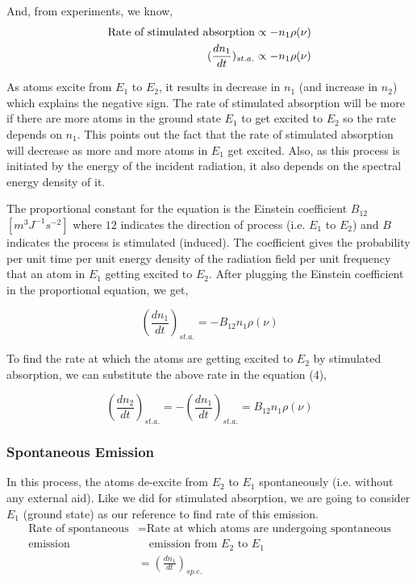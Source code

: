 \documentclass[12pt]{article}
\begin{document}
And, from experiments, we know, 
\begin{align*}
    \textnormal{Rate of stimulated absorption} \propto -n_{1}\rho(\nu) \\ 
    (\frac{dn_{1}}{dt})_{st.a.} \propto -n_{1}\rho(\nu)
\end{align*}

As atoms excite from $E_{1}$ to $E_{2}$, it results in decrease in $n_{1}$ (and increase in $n_{2}$) which explains the negative sign. The rate of stimulated absorption will be more if there are more atoms in the ground state $E_{1}$ to get excited to $E_{2}$ so the rate depends on $n_{1}$. This points out the fact that the rate of stimulated absorption will decrease as more and more atoms in $E_{1}$ get excited. Also, as this process is initiated by the energy of the incident radiation, it also depends on the spectral energy density of it. \vspace{.2cm}

The proportional constant for the equation is the Einstein coefficient $B_{12}$ $[m^{3}J^{-1}s^{-2}]$ where $12$ indicates the direction of process (i.e. $E_{1}$ to $E_{2}$) and $B$ indicates the process is stimulated (induced). The coefficient gives the probability per unit time per unit energy density of the radiation field per unit frequency that an atom in $E_{1}$ getting excited to $E_{2}$. After plugging the Einstein coefficient in the proportional equation, we get,

\begin{equation}
    (\frac{dn_{1}}{dt})_{st.a.} = -B_{12}n_{1}\rho(\nu) 
\end{equation}

To find the rate at which the atoms are getting excited to $E_{2}$ by stimulated absorption, we can substitute the above rate in the equation (4),

\begin{equation*}
    (\frac{dn_{2}}{dt})_{st.a.} = -(\frac{dn_{1}}{dt})_{st.a.} = B_{12}n_{1}\rho(\nu)
\end{equation*}

\subsubsection{Spontaneous Emission}

In this process, the atoms de-excite from $E_{2}$ to $E_{1}$ spontaneously (i.e. without any external aid). Like we did for stimulated absorption, we are going to consider $E_{1}$ (ground state) as our reference to find rate of this emission.
\begin{align*}
    \text{Rate of spontaneous} & = \text{Rate at which atoms are undergoing spontaneous} \\
    \text{emission} & \quad \text{emission from } E_{2} \text{ to } E_{1} \\ 
    & = (\frac{dn_{1}}{dt})_{sp.e.}
\end{align*}
\end{document}
